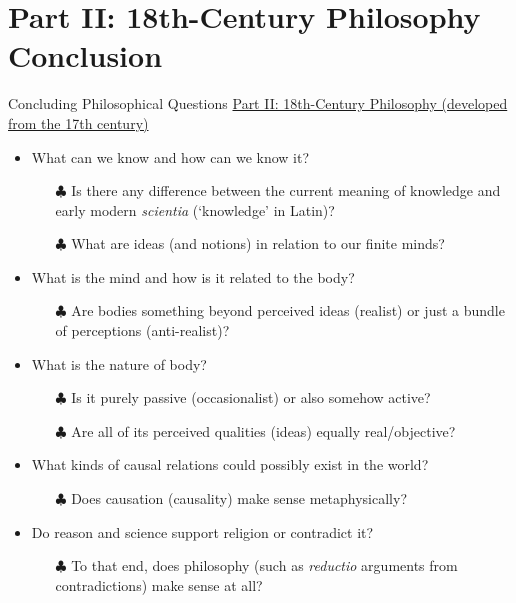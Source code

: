 \documentclass[10pt,letterpaper]{beamer}
\begin{document}
\section[Part II: C18th Conclusion]{Part II: 18th-Century Philosophy Conclusion}
\begin{frame}{Concluding Philosophical Questions}
\underline{Part II: 18th-Century Philosophy (developed from the 17th century)}
\vspace{0.5em}
    \begin{itemize}
        \item What can we know and how can we know it? \pause
             \begin{itemize}
                \item[$\clubsuit$] Is there any difference between the current meaning of knowledge and early modern \textit{scientia} (`knowledge' in Latin)?\pause
                \item[$\clubsuit$] What are \alert{ideas} (and notions) in relation to our finite minds?
            \end{itemize}\pause
        \item What is the mind and how is it related to the body? \pause
            \begin{itemize}
                \item[$\clubsuit$] Are bodies something beyond perceived \alert{ideas} (realist) or just a bundle of perceptions (anti-realist)?
            \end{itemize}\pause
        \item What is the nature of body? \pause
            \begin{itemize}
                \item[$\clubsuit$] Is it purely passive (occasionalist) or also somehow active?\pause
                \item[$\clubsuit$] Are all of its perceived qualities (\alert{ideas}) equally real/objective?
            \end{itemize}\pause
        \item What kinds of causal relations could possibly exist in the world? \pause
            \begin{itemize}
                \item[$\clubsuit$] Does causation (causality) make sense metaphysically?
            \end{itemize}\pause
        \item Do reason and science support religion or contradict it?
            \begin{itemize}
                \item[$\clubsuit$] To that end, does philosophy (such as \textit{reductio} arguments from \alert{contradictions}) make sense at all?
            \end{itemize}\pause

        \end{itemize}
\end{frame}
\end{document}
